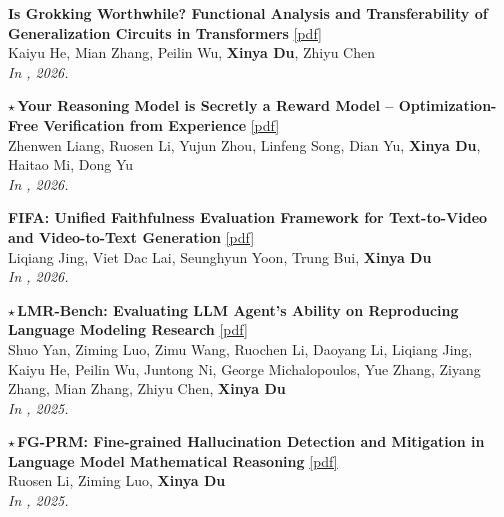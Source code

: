 \begin{enumerate}[{[}1{]},resume,leftmargin=*]
\parbox{\linewidth}{
\item
{\bf Is Grokking Worthwhile? Functional Analysis and Transferability of Generalization Circuits in Transformers}
\href{https://arxiv.org/abs/2601.09049}{{{[pdf]}}} \\
Kaiyu He, Mian Zhang, Peilin Wu, \textbf{Xinya Du}, Zhiyu Chen \\
{\it In \ACLfinding, 2026.} \\
}

\parbox{\linewidth}{
\item\label{pub:verifier}
$\star$\,{\bf Your Reasoning Model is Secretly a Reward Model -- Optimization-Free Verification from Experience}
\href{https://arxiv.org/pdf/2510.01591}{{{[pdf]}}} \\
Zhenwen Liang, Ruosen Li, Yujun Zhou, Linfeng Song, Dian Yu, \textbf{Xinya Du}, Haitao Mi, Dong Yu \\
{\it In \ACL, 2026.} \\
}

\parbox{\linewidth}{
\item
{\bf FIFA: Unified Faithfulness Evaluation Framework for Text-to-Video and Video-to-Text Generation}
\href{https://arxiv.org/abs/2507.06523}{{{[pdf]}}} \\
Liqiang Jing, Viet Dac Lai, Seunghyun Yoon, Trung Bui, \textbf{Xinya Du} \\
{\it In \ACLfinding, 2026.} \\
}

\parbox{\linewidth}{
\item\label{pub:lmrbench}
$\star$\,{\bf LMR-Bench: Evaluating LLM Agent’s Ability on Reproducing Language Modeling Research} 
\href{https://aclanthology.org/2025.emnlp-main.314.pdf}{{{[pdf]}}} \\
Shuo Yan, Ziming Luo, Zimu Wang, Ruochen Li, Daoyang Li, Liqiang Jing, Kaiyu He, Peilin Wu, Juntong Ni, George Michalopoulos, Yue Zhang, Ziyang Zhang, Mian Zhang, Zhiyu Chen, \textbf{Xinya Du} \\
{\it In \EMNLP, 2025.} \\
}

\parbox{\linewidth}{
\item\label{pub:fgprm}
$\star$\,{\bf FG-PRM: Fine-grained Hallucination Detection and Mitigation in Language Model Mathematical Reasoning}
\href{https://aclanthology.org/2025.findings-emnlp.228.pdf}{{{[pdf]}}} \\
Ruosen Li, Ziming Luo, \textbf{Xinya Du} \\
{\it In \EMNLPfinding, 2025.} \\
}


\end{enumerate}
